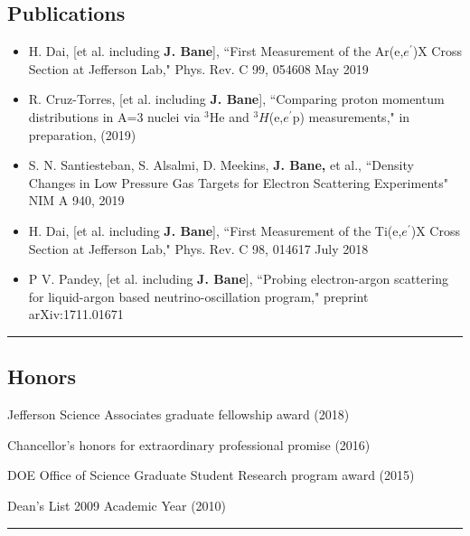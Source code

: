 \documentclass[12pt,letterpaper]{article}
\begin{document}
\subsection*{Publications}
\begin{itemize} \itemsep -2pt %
	\item  H. Dai, [et al. including \textbf{J. Bane}], ``First Measurement of the Ar(e,$e^\prime$)X Cross Section at Jefferson Lab," Phys. Rev. C 99, 054608 May 2019
	\item R. Cruz-Torres, [et al. including \textbf{J. Bane}], ``Comparing proton momentum distributions in A=3 nuclei via $^3$He and $^3H$(e,$e^\prime$p) measurements," in preparation, (2019)
	\item S. N. Santiesteban, S. Alsalmi, D. Meekins, \textbf{J. Bane,} et al., ``Density Changes in Low Pressure Gas Targets for Electron Scattering Experiments" NIM A 940, 2019
	\item  H. Dai, [et al. including \textbf{J. Bane}], ``First Measurement of the Ti(e,$e^\prime$)X Cross Section at Jefferson Lab," Phys. Rev. C 98, 014617 July 2018
	\item P V. Pandey, [et al. including \textbf{J. Bane}], ``Probing electron-argon scattering for liquid-argon based neutrino-oscillation program," preprint arXiv:1711.01671
	
\end{itemize}
\hrule
\subsection*{Honors}
	\begin{itemize*}
		\item Jefferson Science Associates graduate fellowship award (2018)  
		\item Chancellor’s honors for extraordinary professional promise (2016) 
		\item DOE Office of Science Graduate Student Research program award (2015)
		\item Dean's List 2009 Academic Year (2010)
	\end{itemize*}
\hrule
\end{document}
